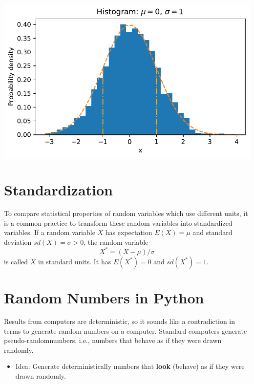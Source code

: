 \documentclass[
  letterpaper,
  DIV=11,
  numbers=noendperiod]{scrreprt}
\providecommand{\tightlist}{%
  \setlength{\itemsep}{0pt}\setlength{\parskip}{0pt}}\usepackage{longtable,booktabs,array}
\begin{document}
\includegraphics{006_num_gp_files/figure-pdf/cell-16-output-1.pdf}

\hypertarget{standardization}{%
\section{Standardization}\label{standardization}}

To compare statistical properties of random variables which use
different units, it is a common practice to transform these random
variables into standardized variables. If a random variable \(X\) has
expectation \(E(X) = \mu\) and standard deviation \(sd(X) = \sigma >0\),
the random variable \[
X^{\ast} = (X-\mu)/\sigma
\] is called \(X\) in standard units. It has \(E(X^{\ast}) = 0\) and
\(sd(X^{\ast}) =1\).

\hypertarget{random-numbers-in-python}{%
\section{Random Numbers in Python}\label{random-numbers-in-python}}

Results from computers are deterministic, so it sounds like a
contradiction in terms to generate random numbers on a computer.
Standard computers generate pseudo-randomnumbers, i.e., numbers that
behave as if they were drawn randomly.

\begin{tcolorbox}[enhanced jigsaw, left=2mm, toprule=.15mm, colframe=quarto-callout-note-color-frame, leftrule=.75mm, title=\textcolor{quarto-callout-note-color}{\faInfo}\hspace{0.5em}{Deterministic Random Numbers}, toptitle=1mm, opacitybacktitle=0.6, arc=.35mm, titlerule=0mm, opacityback=0, bottomtitle=1mm, coltitle=black, rightrule=.15mm, colback=white, colbacktitle=quarto-callout-note-color!10!white, breakable, bottomrule=.15mm]

\begin{itemize}
\tightlist
\item
  Idea: Generate deterministically numbers that \textbf{look} (behave)
  as if they were drawn randomly.
\end{itemize}

\end{tcolorbox}
\end{document}
